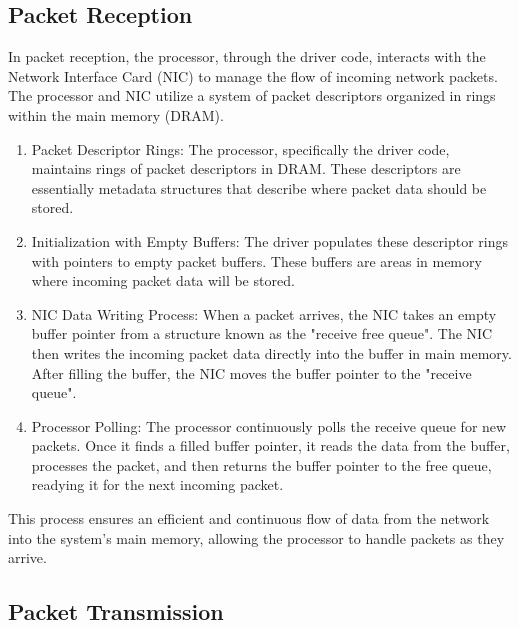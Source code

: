 \documentclass[12pt]{report}
\begin{document}
\subsection{Packet Reception}
In packet reception, the processor, through the driver code, interacts with the Network Interface Card (NIC) to manage the flow of incoming network packets. The processor and NIC utilize a system of packet descriptors organized in rings within the main memory (DRAM).
\begin{enumerate}
    \item Packet Descriptor Rings: The processor, specifically the driver code, maintains rings of packet descriptors in DRAM. These descriptors are essentially metadata structures that describe where packet data should be stored.

    \item Initialization with Empty Buffers: The driver populates these descriptor rings with pointers to empty packet buffers. These buffers are areas in memory where incoming packet data will be stored.

    \item NIC Data Writing Process: When a packet arrives, the NIC takes an empty buffer pointer from a structure known as the "receive free queue". The NIC then writes the incoming packet data directly into the buffer in main memory. After filling the buffer, the NIC moves the buffer pointer to the "receive queue".

    \item Processor Polling: The processor continuously polls the receive queue for new packets. Once it finds a filled buffer pointer, it reads the data from the buffer, processes the packet, and then returns the buffer pointer to the free queue, readying it for the next incoming packet.
\end{enumerate}

This process ensures an efficient and continuous flow of data from the network into the system's main memory, allowing the processor to handle packets as they arrive.

\subsection{Packet Transmission}
\end{document}

